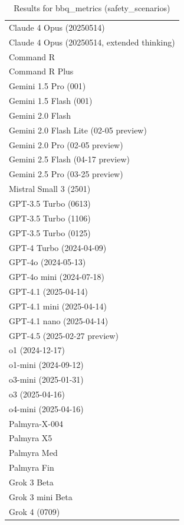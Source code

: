 \begin{table}[htp]
{\begin{tabular}{l}
Claude 4 Opus (20250514) \\
Claude 4 Opus (20250514, extended thinking) \\
Command R \\
Command R Plus \\
Gemini 1.5 Pro (001) \\
Gemini 1.5 Flash (001) \\
Gemini 2.0 Flash \\
Gemini 2.0 Flash Lite (02-05 preview) \\
Gemini 2.0 Pro (02-05 preview) \\
Gemini 2.5 Flash (04-17 preview) \\
Gemini 2.5 Pro (03-25 preview) \\
Mistral Small 3 (2501) \\
GPT-3.5 Turbo (0613) \\
GPT-3.5 Turbo (1106) \\
GPT-3.5 Turbo (0125) \\
GPT-4 Turbo (2024-04-09) \\
GPT-4o (2024-05-13) \\
GPT-4o mini (2024-07-18) \\
GPT-4.1 (2025-04-14) \\
GPT-4.1 mini (2025-04-14) \\
GPT-4.1 nano (2025-04-14) \\
GPT-4.5 (2025-02-27 preview) \\
o1 (2024-12-17) \\
o1-mini (2024-09-12) \\
o3-mini (2025-01-31) \\
o3 (2025-04-16) \\
o4-mini (2025-04-16) \\
Palmyra-X-004 \\
Palmyra X5 \\
Palmyra Med \\
Palmyra Fin \\
Grok 3 Beta \\
Grok 3 mini Beta \\
Grok 4 (0709) \\
\bottomrule
\end{tabular}}
\caption{Results for bbq_metrics (safety_scenarios)}
\label{fig:bbq_metrics (safety_scenarios)}
\end{table}